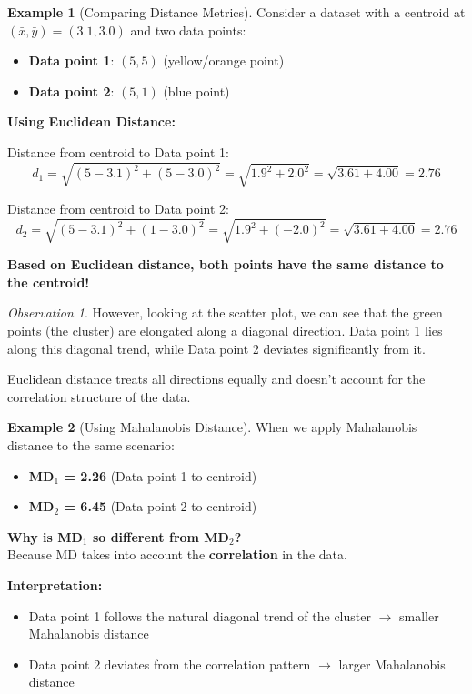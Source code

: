\documentclass[11pt,a4paper]{article}
\theoremstyle{definition}
\newtheorem{example}{Example}[section]
\theoremstyle{plain}
\theoremstyle{remark}
\newtheorem*{observation}{Observation}
\begin{document}
\begin{example}[Comparing Distance Metrics]
Consider a dataset with a centroid at $(\bar{x}, \bar{y}) = (3.1, 3.0)$ and two data points:
\begin{itemize}
    \item \textbf{Data point 1}: $(5, 5)$ (yellow/orange point)
    \item \textbf{Data point 2}: $(5, 1)$ (blue point)
\end{itemize}

\textbf{Using Euclidean Distance:}

Distance from centroid to Data point 1:
\[
d_1 = \sqrt{(5-3.1)^2 + (5-3.0)^2} = \sqrt{1.9^2 + 2.0^2} = \sqrt{3.61 + 4.00} = 2.76
\]

Distance from centroid to Data point 2:
\[
d_2 = \sqrt{(5-3.1)^2 + (1-3.0)^2} = \sqrt{1.9^2 + (-2.0)^2} = \sqrt{3.61 + 4.00} = 2.76
\]

\begin{center}
\colorbox{purple!15}{\parbox{0.9\textwidth}{
\centering
\textbf{Based on Euclidean distance, both points have the same distance to the centroid!}
}}
\end{center}
\end{example}

\begin{observation}
However, looking at the scatter plot, we can see that the green points (the cluster) are elongated along a diagonal direction. Data point 1 lies along this diagonal trend, while Data point 2 deviates significantly from it.

Euclidean distance treats all directions equally and doesn't account for the correlation structure of the data.
\end{observation}

\begin{example}[Using Mahalanobis Distance]
When we apply Mahalanobis distance to the same scenario:

\begin{itemize}
    \item \textbf{MD$_1$ = 2.26} (Data point 1 to centroid)
    \item \textbf{MD$_2$ = 6.45} (Data point 2 to centroid)
\end{itemize}

\begin{center}
\colorbox{orange!15}{\parbox{0.9\textwidth}{
\textbf{Why is MD$_1$ so different from MD$_2$?}\\[0.2cm]
Because MD takes into account the \textbf{correlation} in the data.
}}
\end{center}

\textbf{Interpretation:}
\begin{itemize}
    \item Data point 1 follows the natural diagonal trend of the cluster $\rightarrow$ smaller Mahalanobis distance
    \item Data point 2 deviates from the correlation pattern $\rightarrow$ larger Mahalanobis distance
\end{itemize}
\end{example}
\end{document}
